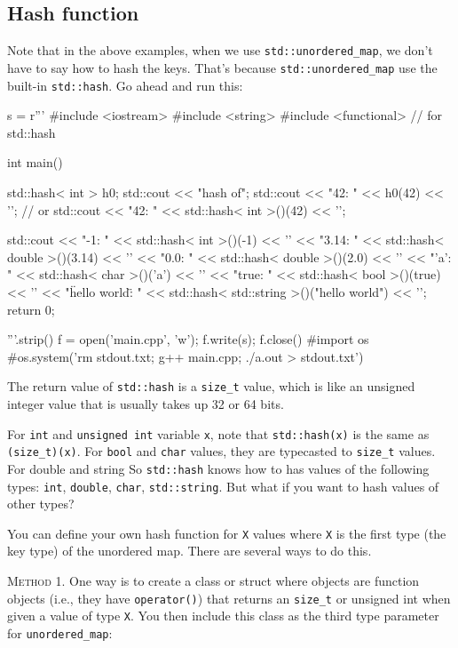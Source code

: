 \subsection{Hash function}

Note that in the above examples, when we use \verb!std::unordered_map!,
we don't have to say how to hash the keys.
That's because \verb!std::unordered_map! use the built-in
\verb!std::hash!.
Go ahead and run this:
\begin{python}
s = r'''
#include <iostream>
#include <string>
#include <functional> // for std::hash

int main()
{
    std::hash< int > h0;
    std::cout << "hash of\n";
    std::cout << "42: " << h0(42) << '\n';
    // or
    std::cout << "42: " << std::hash< int >()(42) << '\n';

    std::cout << "-1: " << std::hash< int >()(-1) << '\n'
              << "3.14: " << std::hash< double >()(3.14) << '\n'
              << "0.0: " << std::hash< double >()(2.0) << '\n'   
              << "'a': " << std::hash< char >()('a') << '\n'
              << "true: " << std::hash< bool >()(true) << '\n'
              << "\"hello world\": "
              << std::hash< std::string >()("hello world") << '\n';
    return 0;
}
'''.strip()
f = open('main.cpp', 'w'); f.write(s); f.close()
#import os
#os.system('rm stdout.txt; g++ main.cpp; ./a.out > stdout.txt')
\end{python}
{\small
{}
}
The return value of \verb!std::hash! is a \verb!size_t! value,
which is like an unsigned integer value
that is usually takes up 32 or 64 bits.

For \verb!int! and \verb!unsigned int! variable
\verb!x!, note that \verb!std::hash(x)!
is the same as \verb!(size_t)(x)!.
For \verb!bool! and \verb!char! values, they are typecasted to
\verb!size_t! values.
For double and string
So \verb!std::hash! knows how to has values of
the following types:
\verb!int!, \verb!double!, \verb!char!, \verb!std::string!.
But what if you want to hash values of other types?

You can define your own hash function for
\verb!X! values where \verb!X! is the first
type (the key type) of the unordered map.
There are several ways to do this.

\textsc{Method 1.}
One way is to create a class or struct where objects are function
objects (i.e., they have \verb!operator()!) that
returns an \verb!size_t! or unsigned int when given a value of type \verb!X!.
You then include this class as the third type parameter
for \verb!unordered_map!:

